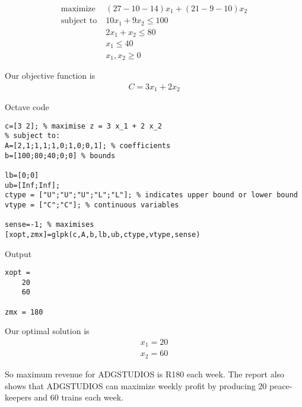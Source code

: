 \begin{equation}
\begin{aligned}
    \text{maximize} \; & (27-10-14)x_1 + (21-9-10)x_2 \\
    \text{subject to} \; & 10x_1 + 9x_2 \leq 100 \\
    & 2x_1 + x_2 \leq 80 \\
    & x_1 \leq 40 \\
    & x_1, x_2 \geq 0
\end{aligned}
\end{equation}

Our objective function is
\begin{equation}
\begin{aligned}
    C = 3x_1 + 2x_2
\end{aligned}
\end{equation}

Octave code

\begin{verbatim}
c=[3 2]; % maximise z = 3 x_1 + 2 x_2
% subject to:
A=[2,1;1,1;1,0;1,0;0,1]; % coefficients
b=[100;80;40;0;0] % bounds

lb=[0;0]
ub=[Inf;Inf];
ctype = ["U";"U";"U";"L";"L"]; % indicates upper bound or lower bound
vtype = ["C";"C"]; % continuous variables

sense=-1; % maximises
[xopt,zmx]=glpk(c,A,b,lb,ub,ctype,vtype,sense)
\end{verbatim}

Output

\begin{verbatim}
xopt =
    20
    60

zmx = 180
\end{verbatim}

Our optimal solution is
\begin{equation}
\begin{aligned}
    x_1 = 20 \\
    x_2 = 60
\end{aligned}
\end{equation}

So maximum revenue for ADGSTUDIOS is R180 each week. The report also shows that ADGSTUDIOS can maximize weekly profit by producing 20 peace-keepers and 60 trains each week.
